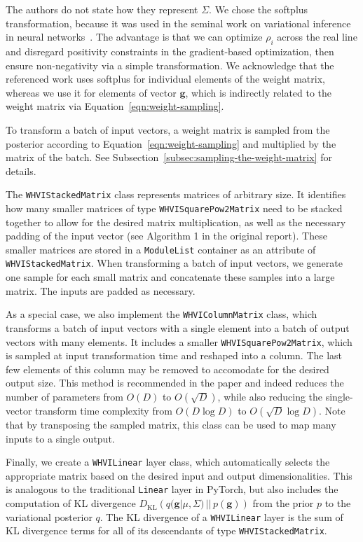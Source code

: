 \documentclass[11pt, twocolumn]{article}
\begin{document}
    The authors do not state how they represent $\Sigma$.
    We chose the softplus transformation, because it was used in the seminal work on variational inference in neural networks~\cite{blundell2015weight}.
    The advantage is that we can optimize $\rho_i$ across the real line and disregard positivity constraints in the gradient-based optimization, then ensure non-negativity via a simple transformation.
    We acknowledge that the referenced work uses softplus for individual elements of the weight matrix, whereas we use it for elements of vector $\mathbf{g}$, which is indirectly related to the weight matrix via Equation~\ref{eqn:weight-sampling}.

    To transform a batch of input vectors, a weight matrix is sampled from the posterior according to Equation~\ref{eqn:weight-sampling} and multiplied by the matrix of the batch. See Subsection~\ref{subsec:sampling-the-weight-matrix} for details.

    The \texttt{WHVIStackedMatrix} class represents matrices of arbitrary size.
    It identifies how many smaller matrices of type \texttt{WHVISquarePow2Matrix} need to be stacked together to allow for the desired matrix multiplication, as well as the necessary padding of the input vector (see Algorithm 1 in the original report).
    These smaller matrices are stored in a \texttt{ModuleList} container as an attribute of \texttt{WHVIStackedMatrix}. When transforming a batch of input vectors, we generate one sample for each small matrix and concatenate these samples into a large matrix. The inputs are padded as necessary.

    As a special case, we also implement the \texttt{WHVIColumnMatrix} class, which transforms a batch of input vectors with a single element into a batch of output vectors with many elements.
    It includes a smaller \texttt{WHVISquarePow2Matrix}, which is sampled at input transformation time and reshaped into a column.
    The last few elements of this column may be removed to accomodate for the desired output size.
    This method is recommended in the paper and indeed reduces the number of parameters from $O(D)$ to $O(\sqrt{D})$, while also reducing the single-vector transform time complexity from $O(D\log D)$ to $O(\sqrt{D}\log D)$.
    Note that by transposing the sampled matrix, this class can be used to map many inputs to a single output.

    Finally, we create a \texttt{WHVILinear} layer class, which automatically selects the appropriate matrix based on the desired input and output dimensionalities.
    This is analogous to the traditional \texttt{Linear} layer in PyTorch, but also includes the computation of KL divergence $D_\mathrm{KL}\left(q(\mathbf{g}|\mu, \Sigma)\, ||\, p(\mathbf{g})\right)$ from the prior $p$ to the variational posterior $q$.
    The KL divergence of a \texttt{WHVILinear} layer is the sum of KL divergence terms for all of its descendants of type \texttt{WHVIStackedMatrix}.
\end{document}

